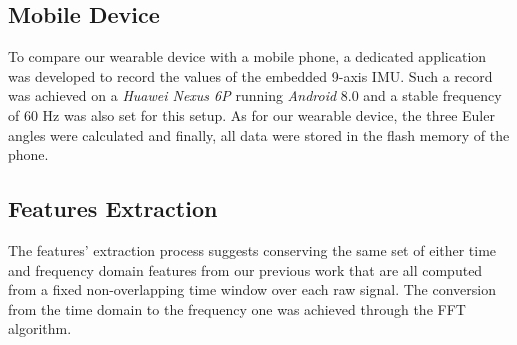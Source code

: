 \documentclass[10pt,conference]{IEEEtran}
\begin{document}

\subsection{Mobile Device}
To compare our wearable device with a mobile phone, a dedicated application was developed to record the values of the embedded 9-axis IMU. Such a record was achieved on a \textit{Huawei Nexus 6P} running \textit{Android} 8.0 and a stable frequency of 60 Hz was also set for this setup. As for our wearable device, the three Euler angles were calculated and finally, all data were stored in the flash memory of the phone.


\subsection{Features Extraction}
The features' extraction process suggests conserving the same set of either time and frequency domain features from our previous work {\cite{Thullier2017b}} that are all computed from a fixed non-overlapping time window over each raw signal. The conversion from the time domain to the frequency one was achieved through the FFT algorithm.

\end{document}
